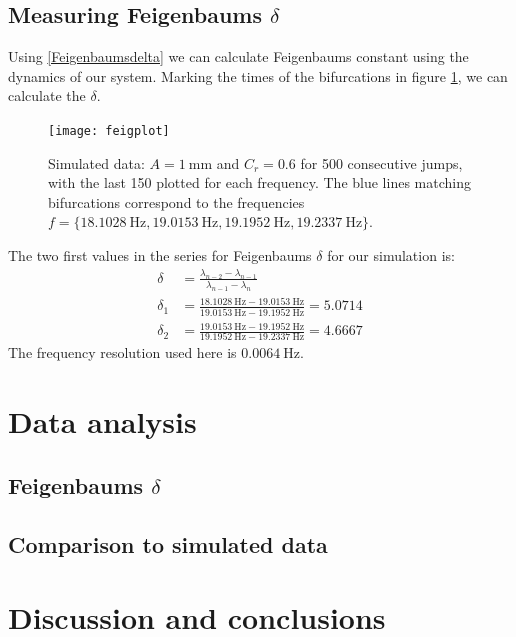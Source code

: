 \documentclass[12pt,oneside,a4paper]{article}
\numberwithin{equation}{section}
\begin{document}
{{{{\subsection{Measuring Feigenbaums $\delta$}
Using \eqref{Feigenbaumsdelta} we can calculate Feigenbaums constant using the dynamics of our system. Marking the times of the bifurcations in figure  \ref{feigsim}, we can calculate the $\delta$.
\begin{figure}[h]
\centering
\texttt{[image: feigplot]} 
\caption{Simulated data: $A=\SI{1}{\mm}$ and $C_r=\num{0.6}$ for 500 consecutive jumps, with the last 150 plotted for each frequency. The blue lines matching bifurcations correspond to the frequencies $f=\{\SI{18.1028}{\hertz},\SI{19.0153}{\hertz},\SI{19.1952}{\hertz},\SI{19.2337}{\hertz} \}$.}\label{feigsim}
\end{figure}
The two first values in the series for Feigenbaums $\delta$ for our simulation is:
\begin{align*}
\delta&=\frac{\lambda_{n-2} - \lambda_{n-1}}{\lambda_{n-1}-\lambda_n}\\
\delta_1&=\frac{\SI{18.1028}{\hertz}-\SI{19.0153}{\hertz}}{\SI{19.0153}{\hertz}-\SI{19.1952}{\hertz}} = 5.0714\\
\delta_2&=\frac{\SI{19.0153}{\hertz}-\SI{19.1952}{\hertz}}{\SI{19.1952}{\hertz}-\SI{19.2337}{\hertz}} = 4.6667
\end{align*}
The frequency resolution used here is $\SI{0.0064}{\hertz}$.
\section{Data analysis}
\subsection{Feigenbaums $\delta$}

\subsection{Comparison to simulated data}

\section{Discussion and conclusions}

\newpage



\newpage
\appendix
}}}}
\end{document}
